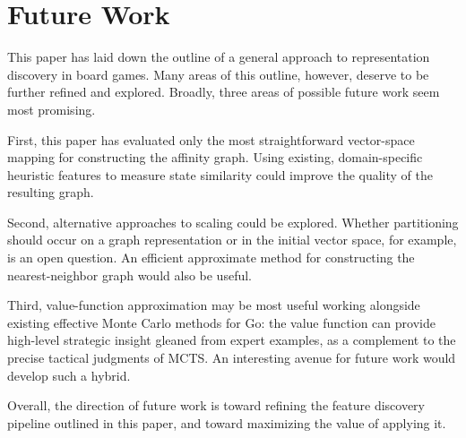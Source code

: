 \section{Future Work}

This paper has laid down the outline of a general approach to representation
discovery in board games. Many areas of this outline, however, deserve to be
further refined and explored. Broadly, three areas of possible future work seem
most promising.

First, this paper has evaluated only the most straightforward vector-space
mapping for constructing the affinity graph. Using existing, domain-specific
heuristic features to measure state similarity could improve the quality of
the resulting graph.

Second, alternative approaches to scaling could be explored. Whether
partitioning should occur on a graph representation or in the initial vector
space, for example, is an open question. An efficient approximate method for
constructing the nearest-neighbor graph would also be useful.

Third, value-function approximation may be most useful working alongside
existing effective Monte Carlo methods for Go: the value function can provide
high-level strategic insight gleaned from expert examples, as a complement to
the precise tactical judgments of MCTS. An interesting avenue for future work
would develop such a hybrid.

Overall, the direction of future work is toward refining the feature discovery
pipeline outlined in this paper, and toward maximizing the value of applying
it.

